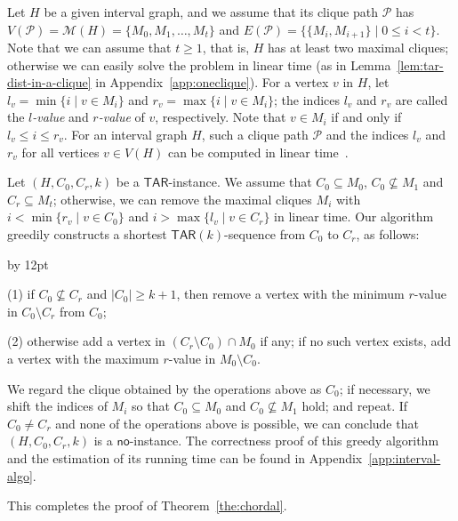 \documentclass{llncs}
\newcommand{\TAR}[1]{\mathsf{TAR}(#1)}
\newcommand{\ini}{0}
\newcommand{\tar}{r}
\newcommand{\cliq}{C}
\newcommand{\TARrule}{\mathsf{TAR}}
\newcommand{\NO}{\mathsf{no}}
\newcommand{\Mset}[1]{\mathcal{M}(#1)}
\newcommand{\subH}{H}
\newcommand{\intH}{\subH}
\newenvironment{listing}[1]{\begin{list}{*}{\settowidth{\labelwidth}{#1}\setlength{\leftmargin}{\labelwidth}\advance \leftmargin by 12pt
\setlength{\itemsep}{0pt}\setlength{\parsep}{0pt}\setlength{\topsep}{0pt}\setlength{\parskip}{0pt}}}{\end{list}}
\newcounter{one}
\newcounter{two}
\begin{document}
Let $\intH$ be a given interval graph, and we assume that its clique path $\mathcal{P}$ has $V(\mathcal{P}) = \Mset{\intH} = \{M_{0}, M_{1}, \ldots, M_{t}\}$ and $E(\mathcal{P}) = \{\{M_{i}, M_{i+1}\} \mid 0 \le i < t\}$. 
	Note that we can assume that $t \ge 1$, that is, $\intH$ has at least two maximal cliques;
otherwise we can easily solve the problem in linear time (as in Lemma~\ref{lem:tar-dist-in-a-clique} in Appendix~\ref{app:oneclique}).
	For a vertex $v$ in $\intH$, let $l_{v} = \min\{i \mid v \in M_{i}\}$ and $r_{v} = \max\{i \mid v \in M_{i}\}$;
the indices $l_v$ and $r_v$ are called the \emph{$l$-value} and \emph{$r$-value} of $v$, respectively.
	Note that $v \in M_{i}$ if and only if $l_{v} \le i \le r_{v}$.
	For an interval graph $\intH$, such a clique path $\mathcal{P}$ and the indices $l_{v}$ and $r_{v}$ for all vertices $v \in V(\intH)$ can be computed in linear time~\cite{UeharaU07}.

	Let $(\intH, \cliq_{\ini}, \cliq_{\tar}, k)$ be a $\TARrule$-instance.
	We assume that $\cliq_{\ini} \subseteq M_{0}$, $\cliq_{\ini} \not\subseteq M_{1}$ and $\cliq_{\tar} \subseteq M_{t}$;
otherwise, we can remove the maximal cliques $M_{i}$ with $i < \min\{r_{v} \mid v \in \cliq_{\ini} \}$ and $i > \max\{l_{v} \mid v \in \cliq_{\tar} \}$ in linear time.
	Our algorithm greedily constructs a shortest $\TAR{k}$-sequence from $\cliq_{\ini}$ to $\cliq_{\tar}$, as follows:
	\begin{listing}{aaa}
	\item[(1)] if $\cliq_{\ini} \not\subseteq \cliq_{\tar}$ and $|\cliq_{\ini}| \ge k+1$, then remove a vertex with the minimum $r$-value in $\cliq_{\ini} \setminus \cliq_{\tar}$ from $\cliq_{\ini}$; 
	\item[(2)] otherwise add a vertex in $(\cliq_{\tar} \setminus \cliq_{\ini}) \cap M_{0}$ if any; 
					if no such vertex exists, add a vertex with the maximum $r$-value in $M_{0} \setminus \cliq_{\ini}$.
	\end{listing}
	We regard the clique obtained by the operations above as $\cliq_{\ini}$;
if necessary, we shift the indices of $M_i$ so that $\cliq_{\ini} \subseteq M_{0}$ and $\cliq_{\ini} \not\subseteq M_{1}$ hold; and repeat.
	If $\cliq_{\ini} \neq \cliq_{\tar}$ and none of the operations above is possible, we can conclude that $(\intH, \cliq_{\ini}, \cliq_{\tar}, k)$ is a $\NO$-instance.
	The correctness proof of this greedy algorithm and the estimation of its running time can be found in Appendix~\ref{app:interval-algo}.

	This completes the proof of Theorem~\ref{the:chordal}. 
\end{document}
